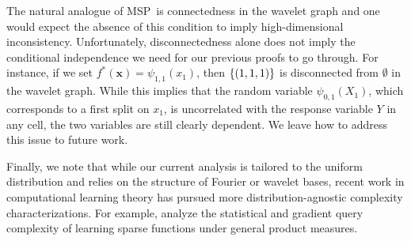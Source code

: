 \documentclass[11pt]{article}
\newtheorem{proposition}[theorem]{Proposition}
\newtheorem{remark}[theorem]{Remark}
\newcommand{\bx}{\mathbf{x}}
\DeclarePairedDelimiter{\braces}{\lbrace}{\rbrace}
\DeclarePairedDelimiter{\paren}{(}{)}
\newcommand{\E}{\mathbb{E}}
\renewcommand{\xspace}{\mathcal{X}}
\newcommand{\ctsspace}{[0,1]^\nfeats}
\newcommand{\xmeasure}{\nu}
\newcommand{\nfeats}{d}
\newcommand{\nsamples}{n}
\newcommand{\data}[1][n]{\mathcal{D}_{#1}}
\newcommand{\MSP}{\textsf{MSP}}
\newcommand{\wavelet}{\psi}
\newcommand{\comment}[2]{{#2}}
\begin{document}
The natural analogue of \MSP~is connectedness in the wavelet graph and one would expect the absence of this condition to imply high-dimensional inconsistency.
Unfortunately, disconnectedness alone does not imply the conditional independence we need for our previous proofs to go through.
For instance, if we set $f^*(\bx) = \wavelet_{1,1}(x_1)$, then $\braces*{(1,1,1)}$ is disconnected from $\emptyset$ in the wavelet graph.
While this implies that the random variable $\psi_{0,1}(X_1)$, which corresponds to a first split on $x_1$, is uncorrelated with the response variable $Y$ in any cell, the two variables are still clearly dependent.
We leave how to address this issue to future work.

\comment{red}{Finally, we note that while our current analysis is tailored to the uniform distribution and relies on the structure of Fourier or wavelet bases, recent work in computational learning theory has pursued more distribution-agnostic complexity characterizations. For example, \citet{joshi2024on} analyze the statistical and gradient query complexity of learning sparse functions under general product measures.}





\end{document}
